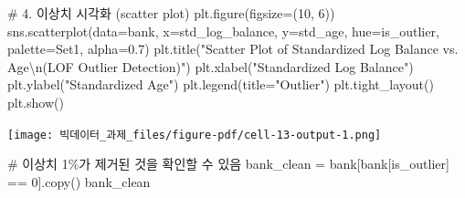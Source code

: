\documentclass[
  a4paper,
  DIV=11,
  numbers=noendperiod]{scrreprt}
\newenvironment{Shaded}{\begin{snugshade}}{\end{snugshade}}
\newcommand{\CharTok}[1]{\textcolor[rgb]{0.13,0.47,0.30}{#1}}
\newcommand{\CommentTok}[1]{\textcolor[rgb]{0.37,0.37,0.37}{#1}}
\newcommand{\DecValTok}[1]{\textcolor[rgb]{0.68,0.00,0.00}{#1}}
\newcommand{\FloatTok}[1]{\textcolor[rgb]{0.68,0.00,0.00}{#1}}
\newcommand{\NormalTok}[1]{\textcolor[rgb]{0.00,0.23,0.31}{#1}}
\newcommand{\OperatorTok}[1]{\textcolor[rgb]{0.37,0.37,0.37}{#1}}
\newcommand{\StringTok}[1]{\textcolor[rgb]{0.13,0.47,0.30}{#1}}
\begin{document}
\begin{Shaded}
\begin{Highlighting}[]
\CommentTok{\# 4. 이상치 시각화 (scatter plot)}
\NormalTok{plt.figure(figsize}\OperatorTok{=}\NormalTok{(}\DecValTok{10}\NormalTok{, }\DecValTok{6}\NormalTok{))}
\NormalTok{sns.scatterplot(data}\OperatorTok{=}\NormalTok{bank, x}\OperatorTok{=}\StringTok{\textquotesingle{}std\_log\_balance\textquotesingle{}}\NormalTok{, y}\OperatorTok{=}\StringTok{\textquotesingle{}std\_age\textquotesingle{}}\NormalTok{,}
\NormalTok{                hue}\OperatorTok{=}\StringTok{\textquotesingle{}is\_outlier\textquotesingle{}}\NormalTok{, palette}\OperatorTok{=}\StringTok{\textquotesingle{}Set1\textquotesingle{}}\NormalTok{, alpha}\OperatorTok{=}\FloatTok{0.7}\NormalTok{)}
\NormalTok{plt.title(}\StringTok{"Scatter Plot of Standardized Log Balance vs. Age}\CharTok{\textbackslash{}n}\StringTok{(LOF Outlier Detection)"}\NormalTok{)}
\NormalTok{plt.xlabel(}\StringTok{"Standardized Log Balance"}\NormalTok{)}
\NormalTok{plt.ylabel(}\StringTok{"Standardized Age"}\NormalTok{)}
\NormalTok{plt.legend(title}\OperatorTok{=}\StringTok{"Outlier"}\NormalTok{)}
\NormalTok{plt.tight\_layout()}
\NormalTok{plt.show()}
\end{Highlighting}
\end{Shaded}

\texttt{[image: 빅데이터\_과제\_files/figure-pdf/cell-13-output-1.png]}

\begin{Shaded}
\begin{Highlighting}[]
\CommentTok{\# 이상치 1\%가 제거된 것을 확인할 수 있음}
\NormalTok{bank\_clean }\OperatorTok{=}\NormalTok{ bank[bank[}\StringTok{\textquotesingle{}is\_outlier\textquotesingle{}}\NormalTok{] }\OperatorTok{==} \DecValTok{0}\NormalTok{].copy()}
\NormalTok{bank\_clean}
\end{Highlighting}
\end{Shaded}
\end{document}
